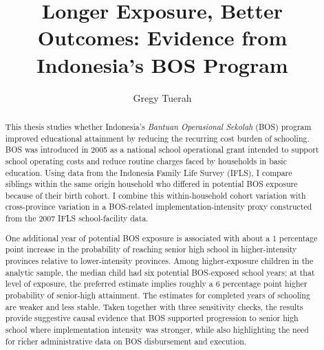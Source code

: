 \documentclass[a4paper, 12pt]{article}
\title{Longer Exposure, Better Outcomes: Evidence from Indonesia’s BOS Program}
\author{Gregy Tuerah}
\date{}
\begin{document}
\maketitle

\begin{abstract}
This thesis studies whether Indonesia's \textit{Bantuan Operasional Sekolah} (BOS) program improved educational attainment by reducing the recurring cost burden of schooling. BOS was introduced in 2005 as a national school operational grant intended to support school operating costs and reduce routine charges faced by households in basic education. Using data from the Indonesia Family Life Survey (IFLS), I compare siblings within the same origin household who differed in potential BOS exposure because of their birth cohort. I combine this within-household cohort variation with cross-province variation in a BOS-related implementation-intensity proxy constructed from the 2007 IFLS school-facility data.

One additional year of potential BOS exposure is associated with about a 1 percentage point increase in the probability of reaching senior high school in higher-intensity provinces relative to lower-intensity provinces. Among higher-exposure children in the analytic sample, the median child had six potential BOS-exposed school years; at that level of exposure, the preferred estimate implies roughly a 6 percentage point higher probability of senior-high attainment. The estimates for completed years of schooling are weaker and less stable. Taken together with three sensitivity checks, the results provide suggestive causal evidence that BOS supported progression to senior high school where implementation intensity was stronger, while also highlighting the need for richer administrative data on BOS disbursement and execution.

\end{abstract}
\end{document}
